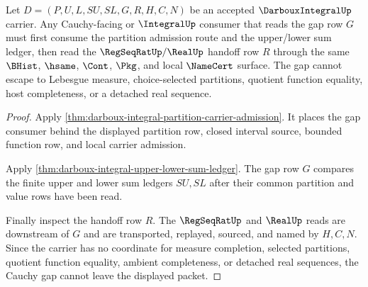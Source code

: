 \begin{theorem}
\label{thm:darboux-integral-cauchy-gap-nonescape}
Let $D=(P,U,L,SU,SL,G,R,H,C,N)$ be an accepted $\DarbouxIntegralUp$ carrier. Any Cauchy-facing or $\IntegralUp$ consumer that reads the gap row $G$ must first consume the partition admission route and the upper/lower sum ledger, then read the $\RegSeqRatUp/\RealUp$ handoff row $R$ through the same $\BHist$, $\hsame$, $\Cont$, $\Pkg$, and local $\NameCert$ surface. The gap cannot escape to Lebesgue measure, choice-selected partitions, quotient function equality, host completeness, or a detached real sequence.
\end{theorem}
\begin{proof}
Apply \autoref{thm:darboux-integral-partition-carrier-admission}. It places the gap consumer behind the displayed partition row, closed interval source, bounded function row, and local carrier admission.

Apply \autoref{thm:darboux-integral-upper-lower-sum-ledger}. The gap row $G$ compares the finite upper and lower sum ledgers $SU,SL$ after their common partition and value rows have been read.

Finally inspect the handoff row $R$. The $\RegSeqRatUp$ and $\RealUp$ reads are downstream of $G$ and are transported, replayed, sourced, and named by $H,C,N$. Since the carrier has no coordinate for measure completion, selected partitions, quotient function equality, ambient completeness, or detached real sequences, the Cauchy gap cannot leave the displayed packet.
\end{proof}

